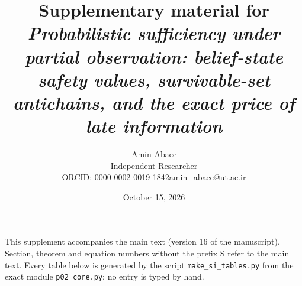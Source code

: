 \documentclass[11pt,a4paper]{article}
\theoremstyle{plain}
\theoremstyle{definition}
\theoremstyle{remark}
\begin{document}
\title{\textbf{Supplementary material for}\\ \emph{Probabilistic sufficiency under partial observation: belief-state safety values, survivable-set antichains, and the exact price of late information}}
\author{Amin Abaee\\[0.3em]{\small Independent Researcher}\\[0.2em]{\small ORCID: \href{https://orcid.org/0000-0002-0019-1842}{0000-0002-0019-1842}\quad \href{mailto:amin_abaee@ut.ac.ir}{amin\_abaee@ut.ac.ir}}}
\date{October 15, 2026}
\maketitle

\noindent This supplement accompanies the main text (version 16 of the manuscript). Section, theorem and equation numbers without the prefix S refer to the main text. Every table below is generated by the script \texttt{make\_si\_tables.py} from the exact module \texttt{p02\_core.py}; no entry is typed by hand.

\tableofcontents
\end{document}
